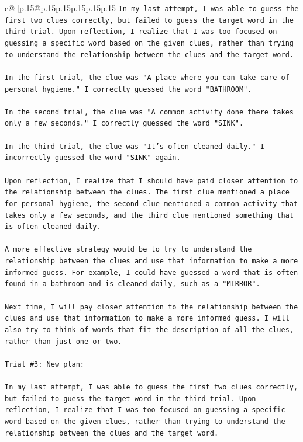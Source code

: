\documentclass{article}
\begin{document}
{\begin{supertabular}{c@{$\;$}|p{.15\linewidth}@{}p{.15\linewidth}p{.15\linewidth}p{.15\linewidth}p{.15\linewidth}p{.15\linewidth}}
{{{\texttt{In my last attempt, I was able to guess the first two clues correctly, but failed to guess the target word in the third trial. Upon reflection, I realize that I was too focused on guessing a specific word based on the given clues, rather than trying to understand the relationship between the clues and the target word. } \\
\\ 
\texttt{In the first trial, the clue was "A place where you can take care of personal hygiene." I correctly guessed the word "BATHROOM". } \\
\\ 
\texttt{In the second trial, the clue was "A common activity done there takes only a few seconds." I correctly guessed the word "SINK". } \\
\\ 
\texttt{In the third trial, the clue was "It's often cleaned daily." I incorrectly guessed the word "SINK" again. } \\
\\ 
\texttt{Upon reflection, I realize that I should have paid closer attention to the relationship between the clues. The first clue mentioned a place for personal hygiene, the second clue mentioned a common activity that takes only a few seconds, and the third clue mentioned something that is often cleaned daily. } \\
\\ 
\texttt{A more effective strategy would be to try to understand the relationship between the clues and use that information to make a more informed guess. For example, I could have guessed a word that is often found in a bathroom and is cleaned daily, such as a "MIRROR". } \\
\\ 
\texttt{Next time, I will pay closer attention to the relationship between the clues and use that information to make a more informed guess. I will also try to think of words that fit the description of all the clues, rather than just one or two.} \\
\\ 
\texttt{Trial \#3: New plan: } \\
\\ 
\texttt{In my last attempt, I was able to guess the first two clues correctly, but failed to guess the target word in the third trial. Upon reflection, I realize that I was too focused on guessing a specific word based on the given clues, rather than trying to understand the relationship between the clues and the target word. } \\
}}}
\end{supertabular}}
\end{document}
